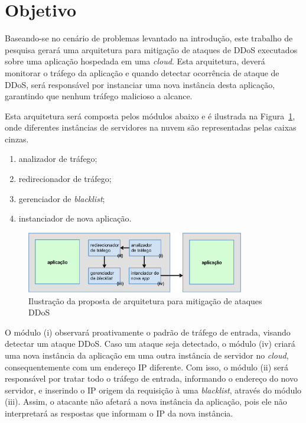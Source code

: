 \documentclass[a4paper, 11pt]{article}
\begin{document}
\section{Objetivo}
Baseando-se no cen\'ario de problemas levantado na introdu\c{c}\~{a}o, este
trabalho de pesquisa gerar\'a uma arquitetura para mitigação de ataques de
DDoS executados sobre uma aplicação hospedada em uma \emph{cloud}. Esta
arquitetura, dever\'a monitorar o tr\'afego da aplica\c{c}\~{a}o e quando
detectar
ocorrência de ataque de DDoS, ser\'a respons\'avel por instanciar uma nova
instância desta
aplica\c{c}\~{a}o, garantindo que nenhum tr\'afego malicioso a alcance.

Esta arquitetura será composta pelos módulos abaixo e é ilustrada na
Figura~\ref{fig:arq}, onde diferentes inst\^ancias de servidores na nuvem s\~ao
representadas pelas caixas cinzas.

\begin{enumerate}[i]
  \item analizador de tráfego;
  \item redirecionador de tráfego;
  \item gerenciador de \emph{blacklist};
  \item instanciador de nova aplica\c{c}\~{a}o.
\end{enumerate}

\begin{figure}[h!]
\centering
\includegraphics[width=0.85\textwidth]{arquitetura.eps}
\caption{Ilustração da proposta de arquitetura para mitigação de ataques DDoS}
\label{fig:arq}
\end{figure}

O módulo (i) observará proativamente o padrão de tráfego de entrada, visando
detectar um ataque DDoS. Caso um ataque seja detectado, o m\'odulo (iv) criará
uma nova
instância da aplicação em uma outra instância de servidor no \emph{cloud},
consequentemente com um endereço IP diferente.
Com isso, o módulo (ii) será responsável por tratar todo o tráfego de
entrada, informando o endereço do novo servidor, e inserindo o IP origem da
requisição à uma \emph{blacklist}, através do módulo (iii). Assim, o
atacante não afetará a nova instância da aplicação, pois ele não interpretará as
respostas que informam o IP da nova instância.
\end{document}
